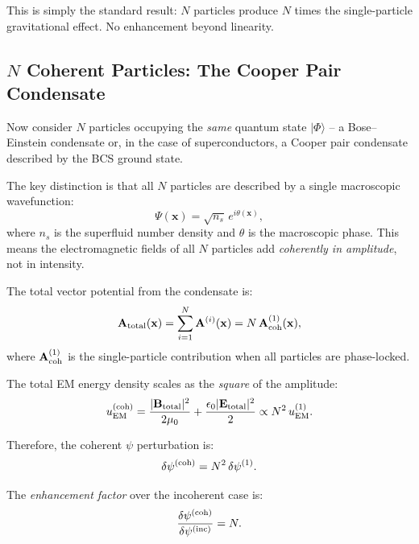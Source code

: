 \documentclass[aps,prd,twocolumn,superscriptaddress,floatfix,nofootinbib]{revtex4-2}
\begin{document}
This is simply the standard result: $N$ particles produce $N$ times the
single-particle gravitational effect. No enhancement beyond linearity.

\subsection{$N$ Coherent Particles: The Cooper Pair Condensate}
\label{sec:coherent}

Now consider $N$ particles occupying the \emph{same} quantum state
$|\Phi\rangle$ -- a Bose--Einstein condensate or, in the case of
superconductors, a Cooper pair condensate described by the BCS
ground state.

The key distinction is that all $N$ particles are described by a single
macroscopic wavefunction:
\begin{equation}
\Psi(\mathbf{x}) = \sqrt{n_s}\,e^{i\theta(\mathbf{x})},
\end{equation}
where $n_s$ is the superfluid number density and $\theta$ is the
macroscopic phase. This means the electromagnetic fields of all $N$
particles add \emph{coherently in amplitude}, not in intensity.

The total vector potential from the condensate is:
\begin{equation}
\mathbf{A}_{\rm total}(\mathbf{x})
= \sum_{i=1}^{N}\mathbf{A}^{(i)}(\mathbf{x})
= N\,\mathbf{A}^{(1)}_{\rm coh}(\mathbf{x}),
\end{equation}
where $\mathbf{A}^{(1)}_{\rm coh}$ is the single-particle contribution
when all particles are phase-locked.

The total EM energy density scales as the \emph{square} of the amplitude:
\begin{equation}
u_{\rm EM}^{(\rm coh)} = \frac{|\mathbf{B}_{\rm total}|^2}{2\mu_0}
+ \frac{\epsilon_0|\mathbf{E}_{\rm total}|^2}{2}
\propto N^2\,u_{\rm EM}^{(1)}.
\label{eq:coherent-N2}
\end{equation}

Therefore, the coherent $\psi$ perturbation is:
\begin{equation}
\delta\psi^{(\rm coh)} = N^2\,\delta\psi^{(1)}.
\label{eq:coherent-psi}
\end{equation}

The \emph{enhancement factor} over the incoherent case is:
\begin{equation}
\frac{\delta\psi^{(\rm coh)}}{\delta\psi^{(\rm inc)}} = N.
\label{eq:enhancement-raw}
\end{equation}
\end{document}
